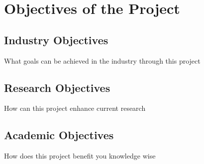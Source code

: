 \section{Objectives of the Project}

\subsection{Industry Objectives}
What goals can be achieved in the industry through this project

\subsection{Research Objectives}
How can this project enhance current research

\subsection{Academic Objectives}
How does this project benefit you knowledge wise

